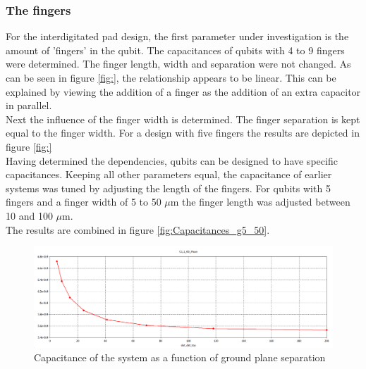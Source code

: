 \subsubsection{The fingers}
For the interdigitated pad design, the first parameter under investigation is the amount of 'fingers' in the  qubit. The capacitances of qubits with 4 to 9 fingers were determined. The finger length, width and separation were not changed.
As can be seen in figure \ref{fig:}, the relationship appears to be linear. This can be explained by viewing the addition of a finger as the addition of an extra capacitor in parallel.\\
Next the influence of the finger width is determined. The finger separation is kept equal to the finger width. For a design with five fingers the results are depicted in figure \ref{fig:} \\

Having determined the dependencies, qubits can be designed to have specific capacitances. Keeping all other parameters equal, the capacitance of earlier systems was tuned by adjusting the length of the fingers. For qubits with 5 fingers and a finger width of 5 to 50 \(\mu\)m the finger length was adjusted between 10 and 100 \(\mu\)m. \\
The results are combined in figure \ref{fig:Capacitances_g5_50}.

 

\begin{figure}
	\centering
	\includegraphics[width = \textwidth]{Figures/capacitance_vs_slotsize}
	\caption{Capacitance of the system as a function of ground plane separation}
	\label{fig:capacitance_vs_slotsize}
\end{figure}

